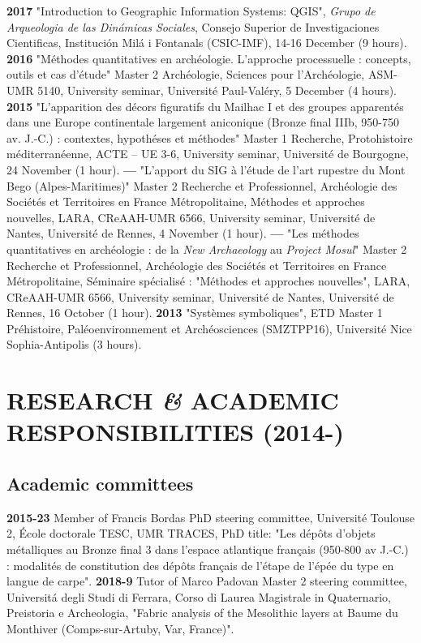 \documentclass{article}
\begin{document}
\smallbreak 
\textbf{2017 }"Introduction to Geographic Information Systems: QGIS", \textit{Grupo de Arqueologia de las Din\'{a}micas Sociales}, Consejo Superior de Investigaciones Cientificas, Instituci\'{o}n Mil\'{a} i Fontanals (CSIC-IMF), 14-16 December (9 hours).
\smallbreak
\textbf{2016 }"M\'{e}thodes quantitatives en arch\'{e}ologie. L'approche processuelle : concepts, outils et cas d'\'{e}tude" Master 2 Arch\'{e}ologie, Sciences pour l'Arch\'{e}ologie, ASM-UMR 5140, University seminar, Universit\'{e} Paul-Val\'{e}ry, 5 December (4 hours).
\smallbreak
\textbf{2015 }"L'apparition des d\'{e}cors figuratifs du Mailhac I et des groupes apparent\'{e}s dans une Europe continentale largement aniconique (Bronze final IIIb, 950-750 av. J.-C.) : contextes, hypoth\'{e}ses et m\'{e}thodes" Master 1 Recherche, Protohistoire m\'{e}diterran\'{e}enne, ACTE -- UE 3-6, University seminar, Universit\'{e} de Bourgogne, 24 November (1 hour).
\smallbreak
\textbf{--- }"L'apport du SIG \`{a} l'\'{e}tude de l'art rupestre du Mont Bego (Alpes-Maritimes)" Master 2 Recherche et Professionnel, Arch\'{e}ologie des Soci\'{e}t\'{e}s et Territoires en France M\'{e}tropolitaine, M\'{e}thodes et approches nouvelles, LARA, CReAAH-UMR 6566, University seminar, Universit\'{e} de Nantes, Universit\'{e} de Rennes, 4 November (1 hour).
\smallbreak
\textbf{--- }"Les m\'{e}thodes quantitatives en arch\'{e}ologie : de la \textit{New Archaeology} au \textit{Project Mosul}" Master 2 Recherche et Professionnel, Arch\'{e}ologie des Soci\'{e}t\'{e}s et Territoires en France M\'{e}tropolitaine, S\'{e}minaire sp\'{e}cialis\'{e} : "M\'{e}thodes et approches nouvelles", LARA, CReAAH-UMR 6566, University seminar, Universit\'{e} de Nantes, Universit\'{e} de Rennes, 16 October (1 hour).
\smallbreak
\textbf{2013 } "Systèmes symboliques", ETD Master 1 Préhistoire, Paléoenvironnement et Archéosciences (SMZTPP16), Université Nice Sophia-Antipolis (3 hours).

\section{RESEARCH \textit{\&} ACADEMIC RESPONSIBILITIES (2014-)}

\subsection*{Academic committees}

\textbf{2015-23 }Member of Francis Bordas PhD steering committee, Universit\'{e} Toulouse 2, \'{E}cole doctorale TESC, UMR TRACES, PhD title: "Les d\'{e}p\^{o}ts d'objets m\'{e}talliques au Bronze final 3 dans l'espace atlantique fran\c{c}ais (950-800 av J.-C.) : modalit\'{e}s de constitution des d\'{e}p\^{o}ts fran\c{c}ais de l'\'{e}tape de l'\'{e}p\'{e}e du type en langue de carpe".
\smallbreak
\textbf{2018-9 }Tutor of Marco Padovan Master 2 steering committee, Universit\'{a} degli Studi di Ferrara, Corso di Laurea Magistrale in Quaternario, Preistoria e Archeologia, "Fabric analysis of the Mesolithic layers at Baume du Monthiver (Comps-sur-Artuby, Var, France)".
\end{document}
